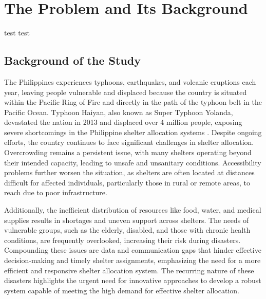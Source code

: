 \chapter{The Problem and Its Background}

	test test

\section{Background of the Study}

	The Philippines experiences typhoons, earthquakes, and volcanic eruptions each year, leaving people vulnerable and displaced because the country is situated within the Pacific Ring of Fire and directly in the path of the typhoon belt in the Pacific Ocean. Typhoon Haiyan, also known as Super Typhoon Yolanda, devastated the nation in 2013 and displaced over 4 million people, exposing severe shortcomings in the Philippine shelter allocation systems \parencite{Iuchi2019}. Despite ongoing efforts, the country continues to face significant challenges in shelter allocation. Overcrowding remains a persistent issue, with many shelters operating beyond their intended capacity, leading to unsafe and unsanitary conditions. Accessibility problems further worsen the situation, as shelters are often located at distances difficult for affected individuals, particularly those in rural or remote areas, to reach due to poor infrastructure.
	
	
	Additionally, the inefficient distribution of resources like food, water, and medical supplies results in shortages and uneven support across shelters. The needs of vulnerable groups, such as the elderly, disabled, and those with chronic health conditions, are frequently overlooked, increasing their risk during disasters. Compounding these issues are data and communication gaps that hinder effective decision-making and timely shelter assignments, emphasizing the need for a more efficient and responsive shelter allocation system. The recurring nature of these disasters highlights the urgent need for innovative approaches to develop a robust system capable of meeting the high demand for effective shelter allocation.
	

